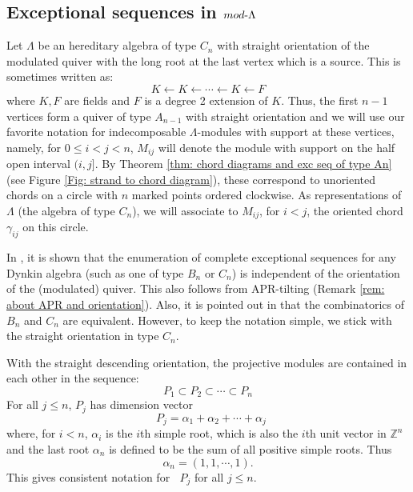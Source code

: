 \documentclass[11pt]{amsart}
\theoremstyle{definition}
\theoremstyle{remark}
\numberwithin{equation}{section}
\DeclareMathOperator{\undim}{\underline{dim}}
\newcommand{\field}[1]{\mathbb{#1}}
\newcommand{\ZZ}{\ensuremath{{\field{Z}}}}
\begin{document}
\subsection{Exceptional sequences in $mod\text-\Lambda$}\label{ss: exc seq in mod Lambda}


Let $\Lambda$ be an hereditary algebra of type $C_n$ with straight orientation of the modulated quiver with the long root at the last vertex which is a source. This is sometimes written as:
\[
	K\leftarrow K\leftarrow\cdots \leftarrow K\leftarrow F
\]
where $K,F$ are fields and $F$ is a degree 2 extension of $K$. Thus, the first $n-1$ vertices form a quiver of type $A_{n-1}$ with straight orientation and we will use our favorite notation for indecomposable $\Lambda$-modules with support at these vertices, namely, for $0\le i<j<n$, $M_{ij}$ will denote the module with support on the half open interval $(i,j]$. By Theorem \ref{thm: chord diagrams and exc seq of type An} (see Figure \ref{Fig: strand to chord diagram}), these correspond to unoriented chords on a circle with $n$ marked points ordered clockwise. As representations of $\Lambda$ (the algebra of type $C_n$), we will associate to $M_{ij}$, for $i<j$, the oriented chord $\gamma_{ij}$ on this circle.


In \cite{Ringel2}, it is shown that the enumeration of complete exceptional sequences for any Dynkin algebra (such as one of type $B_n$ or $C_n$) is independent of the orientation of the (modulated) quiver. This also follows from APR-tilting (Remark \ref{rem: about APR and orientation}). Also, it is pointed out in \cite{Ringel2} that the combinatorics of $B_n$ and $C_n$ are equivalent. However, to keep the notation simple, we stick with the straight orientation in type $C_n$.


With the straight descending orientation, the projective modules are contained in each other in the sequence:
\[
	P_1\subset P_2\subset \cdots\subset P_n
\]
For all $j\le n$, $P_j$ has dimension vector
\[
	\undim P_j=\alpha_1+\alpha_2+\cdots+\alpha_j
\]
where, for $i<n$, $\alpha_i$ is the $i$th simple root, which is also the $i$th unit vector in $\ZZ^n$ and the last root $\alpha_n$ is defined to be the sum of all positive simple roots. Thus
\[
	\alpha_n=(1,1,\cdots,1).
\]
This gives consistent notation for $\undim P_j$ for all $j\le n$. 
\end{document}
